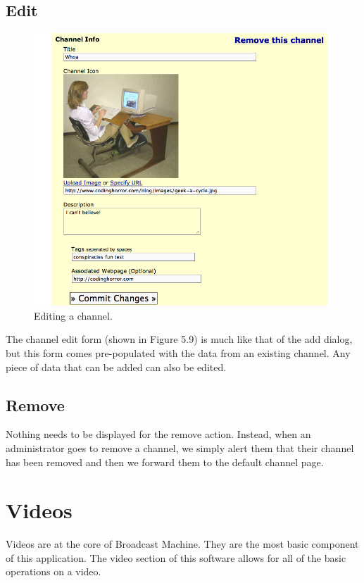 \documentclass[a4paper,12pt]{report}
\begin{document}
\subsection{Edit}
\begin{figure}[htp]
\begin{center}
\includegraphics[width=150mm]{./images/channeledit.png}
\end{center}
\caption{Editing a channel.}
\end{figure}

The channel edit form (shown in Figure 5.9) is much like that of the add dialog, but this form comes pre-populated with the data from an existing channel.
Any piece of data that can be added can also be edited.

\subsection{Remove}
Nothing needs to be displayed for the remove action.
Instead, when an administrator goes to remove a channel, we simply alert them that their channel has been removed and then we forward them to the default channel page.

\section{Videos}
Videos are at the core of Broadcast Machine.
They are the most basic component of this application.
The video section of this software allows for all of the basic operations on a video.
\end{document}
